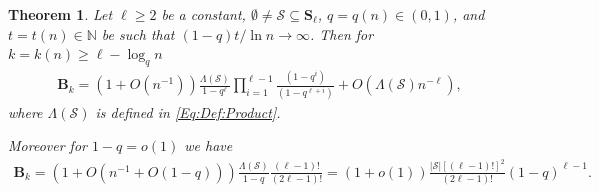 \documentclass[10pt,a4paper]{amsart}
\newtheorem{theorem}{Theorem}
\newcommand{\NN}{\mathbb{N}}
\newcommand{\bB}{\mathbf{B}}
\newcommand{\bS}{\mathbf{S}}
\newcommand{\cS}{\mathcal{S}}
\renewcommand{\ge}{\geqslant}
\newcommand{\productO}{\Lambda(\cS)}
\begin{document}
\begin{theorem}\label{Thm:Qk:value}
	Let $\ell\ge 2$ be a constant, $\emptyset\neq\cS\subseteq \bS_\ell$, $q=q(n)\in (0,1)$, and $t=t(n)\in \NN$ be such that $(1-q)t/\ln n\to \infty$. Then for $k=k(n)\ge \ell -\log_q n$
	\begin{equation*}
		\begin{split}
			\bB_{k}
			=(1+O(n^{-1}))
			\frac{\productO}{1-q^\ell}
			\prod_{i=1}^{\ell-1}\frac{(1-q^i)}{(1-q^{\ell+i})}+O(\productO n^{-\ell}),
		\end{split}
	\end{equation*}
	where $\productO$ is defined in \eqref{Eq:Def:Product}.
	
	Moreover for $1-q=o(1)$ we have
	\begin{equation*}
		\begin{split}
			\bB_{k}=(1+O(n^{-1}+O(1-q)))\frac{\productO}{1-q}\frac{(\ell-1)!}{(2\ell-1)!}
			=(1+o(1))\frac{|\cS|[(\ell-1)!]^2}{(2\ell-1)!}(1-q)^{\ell-1}.
		\end{split}
	\end{equation*}
\end{theorem}
\end{document}
